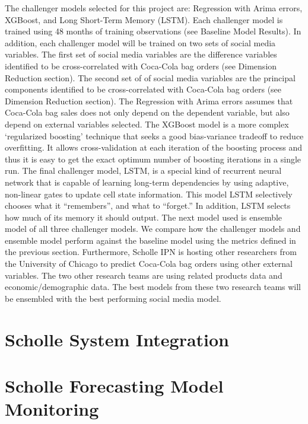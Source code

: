 \documentclass[12pt,oneside]{chicagocapstone}
\begin{document}
The challenger models selected for this project are: Regression with Arima errors, XGBoost, and Long Short-Term Memory (LSTM). Each challenger model is trained using 48 months of training observations (see Baseline Model Results). In addition, each challenger model will be trained on two sets of social media variables. The first set of social media variables are the difference variables identified to be cross-correlated with Coca-Cola bag orders (see Dimension Reduction section). The second set of of social media variables are the principal components identified to be cross-correlated with Coca-Cola bag orders (see Dimension Reduction section). The Regression with Arima errors assumes that Coca-Cola bag sales does not only depend on the dependent variable, but also depend on external variables selected. The XGBoost model is a more complex `regularized boosting' technique that seeks a good bias-variance tradeoff to reduce overfitting. It allows cross-validation at each iteration of the boosting process and thus it is easy to get the exact optimum number of boosting iterations in a single run. The final challenger model, LSTM, is a special kind of recurrent neural network that is capable of learning long-term dependencies by using adaptive, non-linear gates to update cell state information. This model LSTM selectively chooses what it ``remembers'', and what to ``forget.'' In addition, LSTM selects how much of its memory it should output.
The next model used is ensemble model of all three challenger models. We compare how the challenger models and ensemble model perform against the baseline model using the metrics defined in the previous section. Furthermore, Scholle IPN is hosting other researchers from the University of Chicago to predict Coca-Cola bag orders using other external variables. The two other research teams are using related products data and economic/demographic data. The best models from these two research teams will be ensembled with the best performing social media model.

\hypertarget{methodology-modeling}{%
\section*{Scholle System Integration}\label{methodology-modeling}}

\hypertarget{methodology-modeling}{%
\section*{Scholle Forecasting Model Monitoring}\label{methodology-modeling}}
\end{document}
